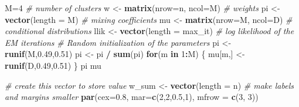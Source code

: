 \documentclass[
]{article}
\newenvironment{Shaded}{\begin{snugshade}}{\end{snugshade}}
\newcommand{\AttributeTok}[1]{\textcolor[rgb]{0.13,0.29,0.53}{#1}}
\newcommand{\CommentTok}[1]{\textcolor[rgb]{0.56,0.35,0.01}{\textit{#1}}}
\newcommand{\ControlFlowTok}[1]{\textcolor[rgb]{0.13,0.29,0.53}{\textbf{#1}}}
\newcommand{\DecValTok}[1]{\textcolor[rgb]{0.00,0.00,0.81}{#1}}
\newcommand{\FloatTok}[1]{\textcolor[rgb]{0.00,0.00,0.81}{#1}}
\newcommand{\FunctionTok}[1]{\textcolor[rgb]{0.13,0.29,0.53}{\textbf{#1}}}
\newcommand{\NormalTok}[1]{#1}
\newcommand{\OtherTok}[1]{\textcolor[rgb]{0.56,0.35,0.01}{#1}}
\newcommand{\SpecialCharTok}[1]{\textcolor[rgb]{0.81,0.36,0.00}{\textbf{#1}}}
\begin{document}
\begin{Shaded}
\begin{Highlighting}[]
\NormalTok{M}\OtherTok{=}\DecValTok{4} \CommentTok{\# number of clusters}
\NormalTok{w }\OtherTok{\textless{}{-}} \FunctionTok{matrix}\NormalTok{(}\AttributeTok{nrow=}\NormalTok{n, }\AttributeTok{ncol=}\NormalTok{M) }\CommentTok{\# weights}
\NormalTok{pi }\OtherTok{\textless{}{-}} \FunctionTok{vector}\NormalTok{(}\AttributeTok{length =}\NormalTok{ M) }\CommentTok{\# mixing coefficients}
\NormalTok{mu }\OtherTok{\textless{}{-}} \FunctionTok{matrix}\NormalTok{(}\AttributeTok{nrow=}\NormalTok{M, }\AttributeTok{ncol=}\NormalTok{D) }\CommentTok{\# conditional distributions}
\NormalTok{llik }\OtherTok{\textless{}{-}} \FunctionTok{vector}\NormalTok{(}\AttributeTok{length =}\NormalTok{ max\_it) }\CommentTok{\# log likelihood of the EM iterations}
\CommentTok{\# Random initialization of the parameters}
\NormalTok{pi }\OtherTok{\textless{}{-}} \FunctionTok{runif}\NormalTok{(M,}\FloatTok{0.49}\NormalTok{,}\FloatTok{0.51}\NormalTok{)}
\NormalTok{pi }\OtherTok{\textless{}{-}}\NormalTok{ pi }\SpecialCharTok{/} \FunctionTok{sum}\NormalTok{(pi)}
\ControlFlowTok{for}\NormalTok{(m }\ControlFlowTok{in} \DecValTok{1}\SpecialCharTok{:}\NormalTok{M) \{}
\NormalTok{  mu[m,] }\OtherTok{\textless{}{-}} \FunctionTok{runif}\NormalTok{(D,}\FloatTok{0.49}\NormalTok{,}\FloatTok{0.51}\NormalTok{)}
\NormalTok{\}}
\NormalTok{pi}
\NormalTok{mu}

\CommentTok{\# create this vector to store value}
\NormalTok{w\_sum }\OtherTok{\textless{}{-}} \FunctionTok{vector}\NormalTok{(}\AttributeTok{length =}\NormalTok{ n)}
\CommentTok{\# make labels and margins smaller}
\FunctionTok{par}\NormalTok{(}\AttributeTok{cex=}\FloatTok{0.8}\NormalTok{, }\AttributeTok{mar=}\FunctionTok{c}\NormalTok{(}\DecValTok{2}\NormalTok{,}\DecValTok{2}\NormalTok{,}\FloatTok{0.5}\NormalTok{,}\DecValTok{1}\NormalTok{), }\AttributeTok{mfrow =} \FunctionTok{c}\NormalTok{(}\DecValTok{3}\NormalTok{, }\DecValTok{3}\NormalTok{))}


\end{Highlighting}
\end{Shaded}
\end{document}

